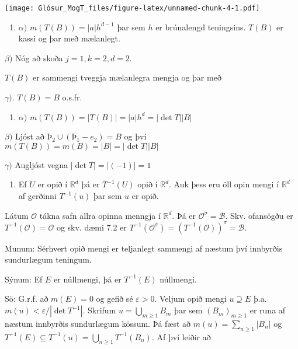 \documentclass[]{book}
\providecommand{\tightlist}{%
  \setlength{\itemsep}{0pt}\setlength{\parskip}{0pt}}
\begin{document}
\texttt{[image: Glósur\_MogT\_files/figure-latex/unnamed-chunk-4-1.pdf]}

\begin{enumerate}
\def\labelenumi{\arabic{enumi}.}
\tightlist
\item
  \(\alpha)\) \(m(T(B)) = |a|h^{d-1}\) þar sem \(h\) er brúnalengd teningsins. \(T(B)\) er kassi og þar með mælanlegt.
\end{enumerate}

\(\beta)\) Nóg að skoða \(j = 1, k = 2, d = 2\).

\(T(B)\) er sammengi tveggja mælanlegra mengja og þar með

\(\gamma)\). \(T(B) = B\) o.s.fr.

\begin{enumerate}
\def\labelenumi{\arabic{enumi}.}
\setcounter{enumi}{1}
\tightlist
\item
  \(\alpha)\) \(m(T(B)) = |T(B)| = |a|h^d = |\det T||B|\)
\end{enumerate}

\(\beta)\) Ljóst að \(Þ_2 \cup (Þ_1 - e_2) = B\) og því \(m(T(B)) = m(B) = |B| = |\det T||B|\)

\(\gamma)\) Augljóst vegna \(|\det T| = |(-1)| = 1\)

\begin{enumerate}
\def\labelenumi{\arabic{enumi}.}
\setcounter{enumi}{2}
\tightlist
\item
  Ef \(U\) er opið í \(\mathbb R^d\) þá er \(T^{-1}(U)\) opið í \(\mathbb R^d\). Auk þess eru öll opin mengi í \(\mathbb R^d\) af gerðinni \(T^{-1}(u)\) þar sem \(u\) er opið.
\end{enumerate}

Látum \(\mathcal O\) tákna safn allra opinna menngja í \(\mathbb R^d\). Þá er \(\mathcal O^\sigma = \mathcal B\). Skv. ofansögðu er \(T^{-1}(\mathcal O) = \mathcal O\) og skv. dæmi 7.2 er \(T^{-1}(\mathcal O^\sigma) = (T^{-1}(\mathcal O))^\sigma = \mathcal B\).

Munum: Sérhvert opið mengi er teljanlegt sammengi af næstum því innbyrðis sundurlægum teningum.

Sýnum: Ef \(E\) er núllmengi, þá er \(T^{-1}(E)\) núllmengi.

Sö: G.r.f. að \(m(E) = 0\) og gefið sé \(\varepsilon > 0\). Veljum opið mengi \(u\supseteq E\) þ.a. \(m(u)<\varepsilon / |\det T^{-1}|\). Skrifum \(u = \bigcup_{m\geq1}B_m\) þar sem \((B_m)_{m\geq1}\) er runa af næstum innbyrðis sundurlægum kössum. Þá fæst að \(m(u) = \sum_{n\geq1}|B_n|\) og \(T^{-1}(E) \subseteq T^{-1}(u) = \bigcup_{n\geq1}T^{-1}(B_n)\). Af því leiðir að
\end{document}
